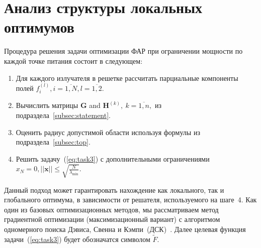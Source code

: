 \chapter{Анализ структуры локальных оптимумов} \label{sec:exp}
Процедура решения задачи оптимизации ФАР при ограничении мощности по каждой точке питания состоит в следующем:
%
\begin{enumerate}
  \item Для каждого излучателя в решетке рассчитать парциальные компоненты полей $f_i^{(l)}, i= \overline{1,N}, l=\overline{1,2}$.
  \item Вычислить матрицы $\textbf{G}$ and $\textbf{H}^{(k)},\ k=\overline{1,n},$ из подраздела~\ref{subsec:statement}.
  \item Оценить радиус допустимой области используя формулы из подраздела~\ref{subsec:top}.
  \item Решить задачу~(\ref{eq:task3}) с дополнительными ограничениями $x_N = 0, ||\textbf{x}||\le \sqrt{\frac{N}{\lambda_{\min}}}$.
\end{enumerate}

Данный подход может гарантировать нахождение как локального, так и глобального оптимума, в зависимости от решателя, используемого на шаге~4. Как один из базовых оптимизационных методов, мы рассматриваем метод градиентной оптимизации (максимизационный вариант)
с алгоритмом одномерного поиска Дэвиса, Свенна и Кэмпи~(ДСК)~\cite{himmelblau:nlp}. Далее целевая функция задачи~(\ref{eq:task3}) будет обозначатся символом $\tilde{F}$.

